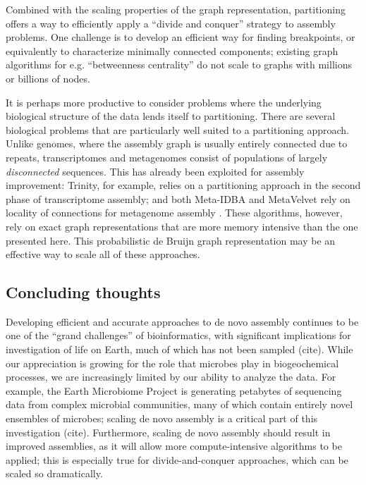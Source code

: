 \documentclass[12pt]{article} \usepackage{simplemargins}
\begin{document}
Combined with the scaling properties of the graph representation,
partitioning offers a way to efficiently apply a ``divide and conquer''
strategy to assembly problems.  One challenge is to develop an
efficient way for finding breakpoints, or equivalently to characterize
minimally connected components; existing graph algorithms for
e.g. ``betweenness centrality'' do not scale to graphs with millions or
billions of nodes.

It is perhaps more productive to consider problems where the
underlying biological structure of the data lends itself to
partitioning.  There are several biological problems that are
particularly well suited to a partitioning approach.  Unlike genomes,
where the assembly graph is usually entirely connected due to repeats,
transcriptomes and metagenomes consist of populations of largely {\em
  disconnected} sequences.  This has already been exploited for
assembly improvement: Trinity, for example, relies on a partitioning
approach in the second phase of transcriptome assembly; and both
Meta-IDBA and MetaVelvet rely on locality of connections for
metagenome assembly \cite{trinity,pubmed21685107,metavelvet}.  These
algorithms, however, rely on exact graph representations that are more
memory intensive than the one presented here.  This probabilistic de
Bruijn graph representation may be an effective way to scale all of
these approaches.

\subsection{Concluding thoughts}


Developing efficient and accurate approaches to de novo assembly
continues to be one of the ``grand challenges'' of bioinformatics,
with significant implications for investigation of life on Earth, much
of which has not been sampled (cite).  While our appreciation is
growing for the role that microbes play in biogeochemical processes,
we are increasingly limited by our ability to analyze the data.  For
example, the Earth Microbiome Project is generating petabytes of
sequencing data from complex microbial communities, many of which
contain entirely novel ensembles of microbes; scaling de novo assembly
is a critical part of this investigation (cite).  Furthermore, scaling
de novo assembly should result in improved assemblies, as it will
allow more compute-intensive algorithms to be applied; this is
especially true for divide-and-conquer approaches, which can be scaled
so dramatically.
\end{document}
